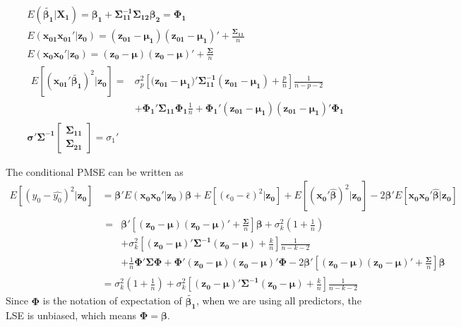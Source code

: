 \documentclass[11pt]{article}
\begin{document}
$$\begin{aligned}
&E(\boldsymbol{\tilde{\beta_1}}|\boldsymbol{X_1})=\boldsymbol{\beta_1}+\boldsymbol{\Sigma_{11}^{-1}\Sigma_{12}\beta_{2}} = \boldsymbol{\Phi_1} \label{lemmaA1}\\
&E(\boldsymbol{x_{01}x_{01}'}|\boldsymbol{z_0})=(\boldsymbol{z_{01}}-\boldsymbol{\mu_1})(\boldsymbol{z_{01}}-\boldsymbol{\mu_1})'+\frac{\boldsymbol{\Sigma_{11}}}{n}\label{LemmaA3}\\
&E(\boldsymbol{x_0x_0'}|\boldsymbol{z_0})=(\boldsymbol{z_0-\mu})(\boldsymbol{z_0}-\boldsymbol{\mu})'+\frac{\boldsymbol{\Sigma}}{n}\label{LemmaA3.1}\\
&
\begin{aligned}E[(\boldsymbol{x_{01}'\tilde{\beta_1}})^2|\boldsymbol{z_0}]
=&\sigma_p^2 \left[(\boldsymbol{z_{01}-\mu_1)'\Sigma_{11}^{-1}(z_{01}-\mu_1)}+\frac{p}{n}\right]\frac{1}{n-p-2}\\
&+\boldsymbol{\Phi_1'\Sigma_{11}\Phi_1}\frac{1}{n}+\boldsymbol{\Phi_{1}'(z_{01}-\mu_{1})(z_{01}-\mu_1)'\Phi_1}\label{LemmaA7}
\end{aligned}\\
&\boldsymbol{\sigma'\Sigma^{-1}}
\begin{bmatrix}
\boldsymbol{\Sigma_{11}}\\ \boldsymbol{\Sigma_{21}}\end{bmatrix}=\sigma_1'\label{LemmaA9}
\end{aligned}
$$

The conditional PMSE can be written as
$$\begin{aligned}
E[(y_0-\hat{y_0})^2|\boldsymbol{z_0}]
&=\boldsymbol{\beta'}E(\boldsymbol{x_0x_0'}|\boldsymbol{z_0})\boldsymbol{\beta}+E[(\epsilon_0-\bar{\epsilon})^2|\boldsymbol{z_0}]+E[(\boldsymbol{x_0'\hat{\beta}})^2|\boldsymbol{z_0}]-2\boldsymbol{\beta'}E[\boldsymbol{x_0x_0'\hat{\beta}}|\boldsymbol{z_0}]\\
&\begin{aligned}=&\boldsymbol{\beta}' \left[\boldsymbol{(z_0-\mu)(z_0-\mu)'}+\frac{\boldsymbol{\Sigma}}{n} \right]\boldsymbol{\beta}+\sigma_k^2 \left(1+\frac{1}{n}\right)\\
&+\sigma_{k}^2 \left[\boldsymbol{(z_0-\mu)'\Sigma^{-1}(z_0-\mu)}+\frac{k}{n} \right]\frac{1}{n-k-2}\\
&+\frac{1}{n}\boldsymbol{\Phi'\Sigma\Phi}+\boldsymbol{\Phi'(z_{0}-\mu)(z_{0}-\mu)'\Phi}-2\boldsymbol{\beta'}\left[\boldsymbol{(z_0-\mu)(z_0-\mu)'}+\frac{\boldsymbol{\Sigma}}{n} \right]\boldsymbol{\beta}
\end{aligned}\\
&=\sigma_k^2\left(1+\frac{1}{n}\right)+\sigma_k^2 \left[\boldsymbol{(z_0-\mu)'\Sigma^{-1}(z_0-\mu)}+\frac{k}{n} \right]\frac{1}{n-k-2}
\end{aligned}$$
Since $\boldsymbol{\Phi}$ is the notation of expectation of $\boldsymbol{\tilde{\beta_1}}$, when we are using all predictors, the LSE is unbiased, which means $\boldsymbol{\Phi} = \boldsymbol{\beta}$. 
\end{document}
